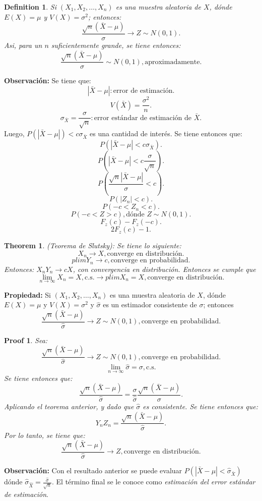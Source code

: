 \documentclass{article}
\newtheorem{mydef}{Definition}
\newtheorem{mythm}{Theorem}
\newtheorem{myprf}{Proof}
\begin{document}
\begin{mydef}
	Si $(X_{1},X_{2},\ldots,X_{n})$ es una muestra aleatoria de $X$, dónde $E(X)=\mu$ y $V(X)=\sigma^{2}$; entonces:
	\[ \frac{\sqrt{n}(\bar{X}-\mu)}{\sigma} \rightarrow Z \sim N(0,1).\]
	Asi, para un $n$ suficientemente grande, se tiene entonces:
	\[ \frac{\sqrt{n}(\bar{X}-\mu)}{\sigma}\sim N(0,1), \text{aproximadamente}.\]
\end{mydef}
\textbf{Observación:} Se tiene que:
\[ |\bar{X}-\mu|: \text{error de estimación}.\]
\[ V(\bar{X})= \frac{\sigma^{2}}{n}.\]
\[ \sigma_{\bar{X}}=\frac{\sigma}{\sqrt{n}}: \text{error estándar de estimación de $\bar{X}$}.\]
Luego, $P(|\bar{X}-\mu|)<c \sigma_{\bar{X}}$ es una cantidad de interés. Se tiene entonces que:
\[ P(|\bar{X}-\mu|< c \sigma_{\bar{X}}).\]
\[ P(|\bar{X}-\mu|< c \frac{\sigma}{\sqrt{n}}).\]
\[ P(\frac{\sqrt{n}|\bar{X}-\mu|}{\sigma}<c).\]
\[ P(|Z_{n}|<c).\]
\[ P(-c < Z_{n} < c).\]
\[ P(-c<Z>c), \text{dónde $Z\sim N(0,1)$}.\]
\[ F_{z}(c)-F_{z}(-c).\]
\[ 2F_{z}(c)-1.\]
\begin{mythm}
	(Teorema de Slutsky): Se tiene lo siguiente:
	\[ X_{n} \rightarrow X, \text{converge en distribución.}\]
	\[ plim Y_{n} \rightarrow c, \text{converge en probabilidad.}\]
	Entonces: $X_{n}Y_{n} \rightarrow cX$, con convergencia en distribución. Entonces se cumple que
	\[ \lim_{n \rightarrow \infty} X_{n}=X, \text{c.s.} \rightarrow plim X_{n}=X, \text{converge en distribución}.\]
\end{mythm}
\textbf{Propiedad:} Si $(X_{1},X_{2},\ldots,X_{n})$ es una muestra aleatoria de $X$, dónde $E(X)=\mu$ y $V(X)=\sigma^{2}$ y $\hat{\sigma}$ es un estimador consistente de $\sigma$; entonces
\[ \frac{\sqrt{n}(\bar{X}-\mu)}{\hat{\sigma}}\rightarrow Z \sim N(0,1), \text{converge en probabilidad.}\]

\begin{myprf}
Sea:
\[ \frac{\sqrt{n}(\bar{X}-\mu)}{\hat{\sigma}}\rightarrow Z \sim N(0,1), \text{converge en probabilidad.}\]
\[ \lim_{n\rightarrow\infty}\hat{\sigma}=\sigma, \text{c.s}.\]
Se tiene entonces que:
\[ \frac{\sqrt{n}(\bar{X}-\mu)}{\hat{\sigma}}=\frac{\sigma}{\hat{\sigma}}\frac{\sqrt{n}(\bar{X}-\mu)}{\sigma}.\]
Aplicando el teorema anterior, y dado que $\hat{\sigma}$ es consistente. Se tiene entonces que:
\[ Y_{n}Z_{n}=\frac{\sqrt{n}(\bar{X}-\mu)}{\hat{\sigma}}.\]
Por lo tanto, se tiene que:
\[ \frac{\sqrt{n}(\bar{X}-\mu)}{\hat{\sigma}} \rightarrow Z, \text{converge en distribución}.\]
\end{myprf}
\textbf{Observación: } Con el resultado anterior se puede evaluar $P(|\bar{X}-\mu| < \hat{\sigma}_{\bar{X}})$ dónde $\hat{\sigma}_{\hat{X}}=\frac{\hat{\sigma}}{\sqrt{n}}$. El término final se le conoce como \textit{estimación del error estándar de estimación}.
\end{document}
